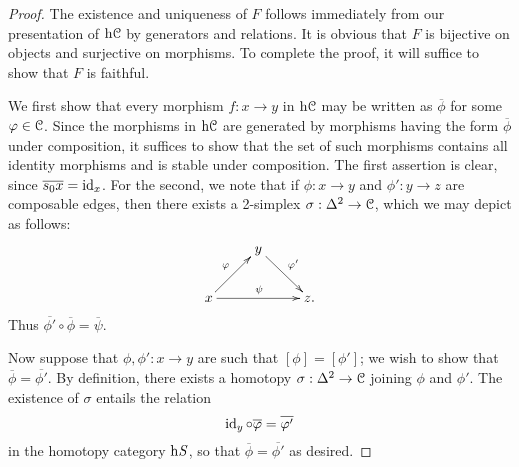 \begin{proof}
The existence and uniqueness of $F$ follows immediately from our presentation
of $\rm{h} \it{\operatorname{\mathcal{C}}}$ by generators and relations. It is obvious that $F$ is bijective on objects and surjective on morphisms. To complete the proof, it will suffice to show that $F$ is faithful.

We first show that every morphism $f: x \rightarrow y$ in $\rm{h} \it{\operatorname{\mathcal{C}}}$ may be written as $\overline{\phi}$ for some $\varphi \in \operatorname{\mathcal{C}}$. Since the morphisms in $\rm{h} \it{\operatorname{\mathcal{C}}}$ are generated by morphisms having the form $\overline{\phi}$ under composition, it suffices to show that the set of such morphisms contains all identity morphisms and is stable under composition. The first assertion is clear, since $\overline{ s_0 x}=\operatorname{id}_x$. For the second, we note that if $\phi: x \rightarrow y$ and $\phi': y \rightarrow z$ are composable edges, then there exists a 2-simplex $\sigma: \Delta^2 \rightarrow \operatorname{\mathcal{C}}$, which we may depict as follows:
$$ \xymatrix{ & y \ar[dr]^{\phi'} & \\
x \ar[ur]^{\phi} \ar[rr]^{\psi} & & z. }$$
Thus $\overline{ \phi' } \circ \overline{\phi} = \overline{ \psi }$.

Now suppose that $\phi,\phi': x \rightarrow y$ are such that $[\phi]=[\phi']$; we wish to show that $\overline{\phi}=\overline{\phi'}$. By definition, there exists a homotopy $\sigma: \Delta^2 \rightarrow \operatorname{\mathcal{C}}$ joining $\phi$ and $\phi'$. The existence of $\sigma$ entails the relation
$$ \operatorname{id}_y \circ \overline{\varphi} = \overline{\varphi'} $$ in the homotopy category $\rm{h} \it{S}$, so that
$\overline{\phi} = \overline{\phi'}$ as desired.
\end{proof}

